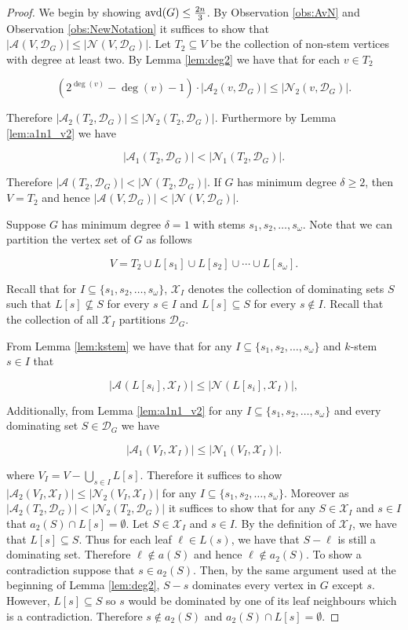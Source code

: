 \documentclass[11pt]{article}
\newcommand{\avd}{\text{\rm{avd}}}
\newcommand{\A}[3][\mathcal{D}_G]{\mathcal{A}_{#3}(#2, #1)}
\newcommand{\N}[3][\mathcal{D}_G]{\mathcal{N}_{#3}(#2, #1)}
\begin{document}
\begin{proof}
We begin by showing $\avd(G) \leq \frac{2n}{3}$. By Observation \ref{obs:AvN} and Observation \ref{obs:NewNotation} it suffices to show that $|\A{V}{}| \leq |\N{V}{}|$. Let $T_2 \subseteq V$ be the collection of non-stem vertices with degree at least two. By Lemma \ref{lem:deg2} we have  that for each $v \in T_2$

$$(2^{\deg(v)}-\deg(v)-1) \cdot |\A{v}{2}| \leq |\N{v}{2}|.$$

\noindent Therefore $|\A{T_2}{2}| \leq |\N{T_2}{2}|$. Furthermore by Lemma \ref{lem:a1n1_v2} we have

$$|\A{T_2}{1}| < |\N{T_2}{1}|.$$

\noindent Therefore $|\A{T_2}{}| < |\N{T_2}{}|$. If $G$ has minimum degree $\delta \geq 2$, then $V=T_2$ and hence $|\A{V}{}| < |\N{V}{}|$.

Suppose $G$ has minimum degree $\delta=1$ with stems $s_1, s_2, \ldots, s_{\omega}$. Note that we can partition the vertex set of $G$ as follows

$$V = T_2 \cup L[s_1] \cup L[s_2] \cup  \cdots \cup L[s_{\omega}].$$


\noindent Recall that for $I \subseteq \{s_1, s_2, \ldots, s_{\omega}\}$, $\mathcal{X}_{I}$ denotes the collection of dominating sets $S$ such that $L[s] \not\subseteq S$ for every $s \in I$ and $L[s] \subseteq S$ for every $s \notin I$. Recall that the collection of all $\mathcal{X}_{I}$ partitions $\mathcal{D}_G$.


From Lemma \ref{lem:kstem} we have that for any $I \subseteq \{s_1, s_2, \ldots, s_{\omega}\}$ and $k$-stem $s \in I$ that

$$|\A[\mathcal{X}_{I}]{L[s_i]}{}|\leq |\N[\mathcal{X}_{I}]{L[s_i]}{}|,$$


\noindent Additionally, from Lemma \ref{lem:a1n1_v2} for any $I \subseteq \{s_1, s_2, \ldots, s_{\omega}\}$ and every dominating set $S \in \mathcal{D}_G$ we have

 $$|\A[\mathcal{X}_I]{V_I}{1}| \leq |\N[\mathcal{X}_I]{V_I}{1}|.$$

\noindent where $V_{I} = V - \bigcup\limits_{s \in I}L[s]$. Therefore it suffices to show $|\A[\mathcal{X}_I]{V_I}{2}| \leq |\N[\mathcal{X}_I]{V_I}{2}|$ for any $I \subseteq \{s_1, s_2, \ldots, s_{\omega}\}$.  Moreover as $|\A{T_2}{2}| < |\N{T_2}{2}|$ it suffices to show that for any $S \in \mathcal{X}_I$ and $s \in I$ that $a_2(S) \cap L[s] = \emptyset$. Let $S \in \mathcal{X}_I$ and $s \in I$. By the definition of $\mathcal{X}_I$, we have that $L[s] \subseteq S$. Thus for each leaf $ \ell \in L(s)$, we have that $S- \ell$ is still a dominating set. Therefore $\ell \notin a(S)$ and hence $\ell \notin a_2(S)$. To show a contradiction suppose that $s \in a_2(S)$. Then, by the same argument used at the beginning of Lemma \ref{lem:deg2}, $S-s$ dominates every vertex in $G$ except $s$. However, $L[s] \subseteq S$ so $s$ would be dominated by one of its leaf neighbours which is a contradiction. Therefore $s \notin a_2(S)$ and $a_2(S) \cap L[s] = \emptyset$.


\end{proof}
\end{document}
